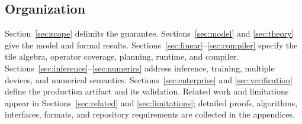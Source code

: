 \subsection{Organization}

Section~\ref{sec:scope} delimits the guarantee. Sections~\ref{sec:model} and \ref{sec:theory} give the model and formal results. Sections~\ref{sec:linear}--\ref{sec:compiler} specify the tile algebra, operator coverage, planning, runtime, and compiler. Sections~\ref{sec:inference}--\ref{sec:numerics} address inference, training, multiple devices, and numerical semantics. Sections~\ref{sec:enterprise} and \ref{sec:verification} define the production artifact and its validation. Related work and limitations appear in Sections~\ref{sec:related} and \ref{sec:limitations}; detailed proofs, algorithms, interfaces, formats, and repository requirements are collected in the appendices.

